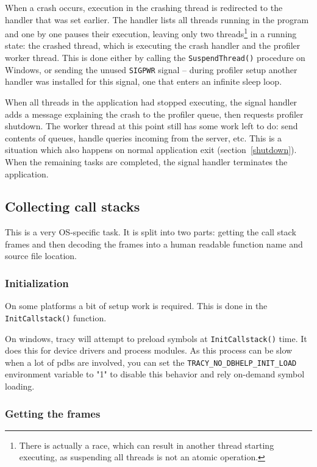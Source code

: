\documentclass[hidelinks,titlepage,a4paper]{article}
\begin{document}
When a crash occurs, execution in the crashing thread is redirected to the handler that was set earlier. The handler lists all threads running in the program and one by one pauses their execution, leaving only two threads\footnote{There is actually a race, which can result in another thread starting executing, as suspending all threads is not an atomic operation.} in a running state: the crashed thread, which is executing the crash handler and the profiler worker thread. This is done either by calling the \texttt{SuspendThread()} procedure on Windows, or sending the unused \texttt{SIGPWR} signal -- during profiler setup another handler was installed for this signal, one that enters an infinite sleep loop.

When all threads in the application had stopped executing, the signal handler adds a message explaining the crash to the profiler queue, then requests profiler shutdown. The worker thread at this point still has some work left to do: send contents of queues, handle queries incoming from the server, etc. This is a situation which also happens on normal application exit (section~\ref{shutdown}). When the remaining tasks are completed, the signal handler terminates the application.

\subsection{Collecting call stacks}
\label{collectingcallstacks}

This is a very OS-specific task. It is split into two parts: getting the call stack frames and then decoding the frames into a human readable function name and source file location.

\subsubsection{Initialization}

On some platforms a bit of setup work is required. This is done in the \texttt{InitCallstack()} function.

On windows, tracy will attempt to preload symbols at \texttt{InitCallstack()} time. It does this for device drivers and process modules. As this process can be slow when a lot of pdbs are involved, you can set the \texttt{TRACY\_NO\_DBHELP\_INIT\_LOAD} environment variable to "1" to disable this behavior and rely on-demand symbol loading.

\subsubsection{Getting the frames}
\end{document}
